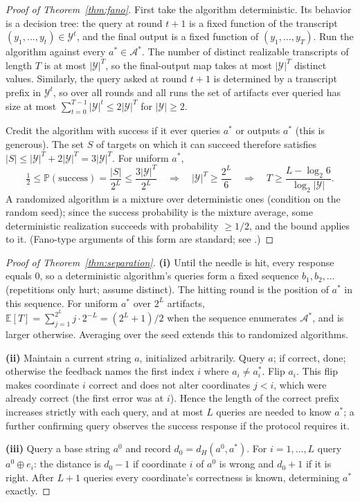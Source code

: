 \documentclass{article}
\theoremstyle{plain}
\theoremstyle{definition}
\theoremstyle{remark}
\newcommand{\A}{\mathcal{A}}
\newcommand{\Y}{\mathcal{Y}}
\newcommand{\E}{\mathbb{E}}
\renewcommand{\P}{\mathbb{P}}
\begin{document}
\begin{proof}[Proof of Theorem~\ref{thm:fano}]
First take the algorithm deterministic. Its behavior is a decision tree: the query at round $t+1$ is a fixed function of the transcript $(y_1, \dots, y_t) \in \Y^t$, and the final output is a fixed function of $(y_1, \dots, y_T)$. Run the algorithm against every $a^* \in \A^*$. The number of distinct realizable transcripts of length $T$ is at most $|\Y|^T$, so the final-output map takes at most $|\Y|^T$ distinct values. Similarly, the query asked at round $t+1$ is determined by a transcript prefix in $\Y^{t}$, so over all rounds and all runs the set of artifacts ever queried has size at most $\sum_{t=0}^{T-1} |\Y|^{t} \le 2 |\Y|^T$ for $|\Y| \ge 2$.

Credit the algorithm with success if it ever queries $a^*$ or outputs $a^*$ (this is generous). The set $S$ of targets on which it can succeed therefore satisfies $|S| \le |\Y|^T + 2|\Y|^T = 3|\Y|^T$. For uniform $a^*$,
\[
\tfrac{1}{2} \le \P(\text{success}) = \frac{|S|}{2^L} \le \frac{3 |\Y|^T}{2^L}
\quad\Longrightarrow\quad
|\Y|^T \ge \frac{2^L}{6}
\quad\Longrightarrow\quad
T \ge \frac{L - \log_2 6}{\log_2 |\Y|} .
\]
A randomized algorithm is a mixture over deterministic ones (condition on the random seed); since the success probability is the mixture average, some deterministic realization succeeds with probability $\ge 1/2$, and the bound applies to it. (Fano-type arguments of this form are standard; see \citealp{cover2006elements}.)
\end{proof}

\begin{proof}[Proof of Theorem~\ref{thm:separation}]
\textbf{(i)} Until the needle is hit, every response equals $0$, so a deterministic algorithm's queries form a fixed sequence $b_1, b_2, \dots$ (repetitions only hurt; assume distinct). The hitting round is the position of $a^*$ in this sequence. For uniform $a^*$ over $2^L$ artifacts, $\E[T] = \sum_{j=1}^{2^L} j \cdot 2^{-L} = (2^L+1)/2$ when the sequence enumerates $\A^*$, and is larger otherwise. Averaging over the seed extends this to randomized algorithms.

\textbf{(ii)} Maintain a current string $a$, initialized arbitrarily. Query $a$; if correct, done; otherwise the feedback names the first index $i$ where $a_i \ne a^*_i$. Flip $a_i$. This flip makes coordinate $i$ correct and does not alter coordinates $j < i$, which were already correct (the first error was at $i$). Hence the length of the correct prefix increases strictly with each query, and at most $L$ queries are needed to know $a^*$; a further confirming query observes the success response if the protocol requires it.

\textbf{(iii)} Query a base string $a^0$ and record $d_0 = d_H(a^0, a^*)$. For $i = 1, \dots, L$ query $a^0 \oplus e_i$: the distance is $d_0 - 1$ if coordinate $i$ of $a^0$ is wrong and $d_0 + 1$ if it is right. After $L+1$ queries every coordinate's correctness is known, determining $a^*$ exactly.
\end{proof}
\end{document}
